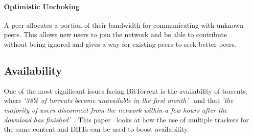 \paragraph*{Optimistic Unchoking}
A peer allocates a portion of their bandwidth for communicating with unknown peers. This allows new users to join the network and be able to contribute without being ignored and gives a way for existing peers to seek better peers.

\subsection*{Availability}\label{subsec:availability}

One of the most significant issues facing BitTorrent is the availability of torrents, where \textit{`38\% of torrents become unavailable in the first month'}~\cite{kaune_unraveling_2010} and that \textit{`the majority of users disconnect from the network within a few hours after the download has finished'}~\cite{pouwelse_bittorrent_2005}.
This paper~\cite{neglia_availability_2007} looks at how the use of multiple trackers for the same content and DHTs can be used to boost availability. 
